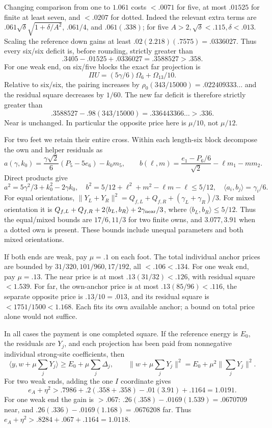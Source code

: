 \documentclass[11pt]{article}
\theoremstyle{definition}
\theoremstyle{remark}
\newcommand{\ip}[2]{\langle #1,#2\rangle}
\newcommand{\norm}[1]{\lVert #1\rVert}
\begin{document}
Changing comparison from one to \(1.061\) costs \(<.0071\)
for five, at most \(.01525\) for finite at least seven, and
\(<.0207\) for dotted. Indeed the relevant extra terms are
\(.061\sqrt\delta\sqrt{1+\delta/A^2}\),
\(.061/4\), and \(.061(.338)\); for five
\(A>2,\sqrt\delta<.115,\delta<.013\).
Scaling the reference down gains at least
\(.02(2.218)(.7575)=.0336027\).
Thus every six/six deficit is, before rounding, strictly greater than
\[
 .3405-.01525+.0336027=.3588527>.358 .
\]
For one weak end, on six/five blocks the exact far projection is
\[
 \Pi U=(5\gamma/6)\Omega_6+\Omega_{13}/10 .
\]
Relative to six/six, the pairing increases by
\(\rho_0(343/15000)=.022409333\ldots\)
and the residual square decreases by \(1/60\).
The new far deficit is therefore strictly greater than
\[
 .3588527-.98(343/15000)=.336443366\ldots>.336 .
\]
Near is unchanged. In particular the opposite price here is
\(\mu/10\), not \(\mu/12\).

For two feet we retain their entire cross.
Within each length-six block decompose the own and helper residuals as
\[
 a(\gamma,k_0)=\frac{\gamma\sqrt2}{6}(P_5-5e_6)-k_0m_5,\qquad
 b(\ell,m)=\frac{e_1-P_6/6}{\sqrt2}-\ell m_1-mm_2 .
\]
Direct products give
\[
 a^2=5\gamma^2/3+k_0^2-2\gamma k_0,\quad
 b^2=5/12+\ell^2+m^2-\ell m-\ell\leq5/12,\quad
 \ip{a_i}{b_j}=\gamma_i/6 .
\]
For equal orientations,
\(\norm{Y_L+Y_R}^2=Q_{f,L}+Q_{f,R}+(\gamma_L+\gamma_R)/3\).
For mixed orientation it is
\(Q_{f,L}+Q_{f,R}+2\ip{b_L}{b_R}+2\gamma_{\rm near}/3\),
where \(\ip{b_L}{b_R}\leq5/12\).
Thus the equal/mixed bounds are \(17/6,11/3\) for two finite
owns, and \(3.077,3.91\) when a dotted own is present.
These bounds include unequal parameters and both mixed orientations.

If both ends are weak, pay \(\mu=.1\) on each foot.
The total individual anchor prices are bounded by
\(31/320,101/960,17/192\), all \(<.106<.134\).
For one weak end, pay \(\mu=.13\).
The near price is at most \(.13(31/32)<.126\), with
residual square \(<1.539\).
For far, the own-anchor price is at most \(.13(85/96)<.116\),
the separate opposite price is \(.13/10=.013\),
and its residual square is \(<1751/1500<1.168\).
Each fits its own available anchor; a bound on total price alone
would not suffice.

In all cases the payment is one completed square.
If the reference energy is \(E_0\), the residuals are \(Y_j\),
and each projection has been paid from nonnegative individual
strong-site coefficients, then
\[
 \ip y{w+\mu\sum_jY_j}\geq E_0+\mu\sum_j\Delta_j,\qquad
 \norm{w+\mu\sum_jY_j}^2=E_0+\mu^2\norm{\sum_jY_j}^2 .
\]
For two weak ends, adding the one \(I\) coordinate gives
\[
 e_A+\eta^2>
 .7986+.2(.358+.358)-.01(3.91)+.1164=1.0191.
\]
For one weak end the gain is \(>.067\):
\(.26(.358)-.0169(1.539)=.0670709\) near, and
\(.26(.336)-.0169(1.168)=.0676208\) far.
Thus \(e_A+\eta^2>.8284+.067+.1164=1.0118\).
\end{document}
